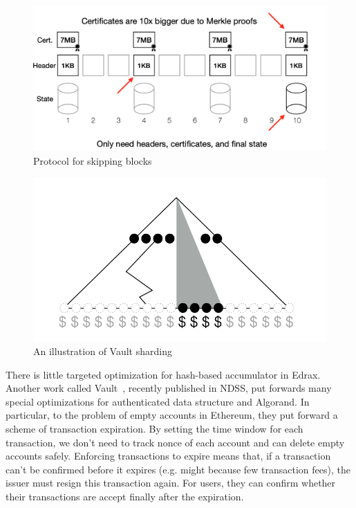 \documentclass[conference]{IEEEtran}
\begin{document}
\begin{figure}[!ht]
  \centering
  \includegraphics[width=\linewidth]{figs/skip-block.png}
  \caption{Protocol for skipping blocks}
  \label{skippping}
\end{figure}

\begin{figure}[!ht]
  \centering
  \includegraphics[width=\linewidth]{figs/sharding.png}
  \caption{An illustration of Vault sharding}
  \label{sharding}
\end{figure}

There is little targeted optimization for hash-based accumulator in Edrax.
%
Another work called Vault~\cite{vault}, recently published in NDSS, put forwards many special optimizations for authenticated data structure and Algorand.
%
In particular, to the problem of empty accounts in Ethereum, they put forward a scheme of transaction expiration.
%
By setting the time window for each transaction, we don't need to track nonce of each account and can delete empty accounts safely.
%
Enforcing transactions to expire means that, if a transaction can't be confirmed before it expires (e.g. might because few transaction fees), the issuer must resign this transaction again.
%
For users, they can confirm whether their transactions are accept finally after the expiration.
\end{document}
